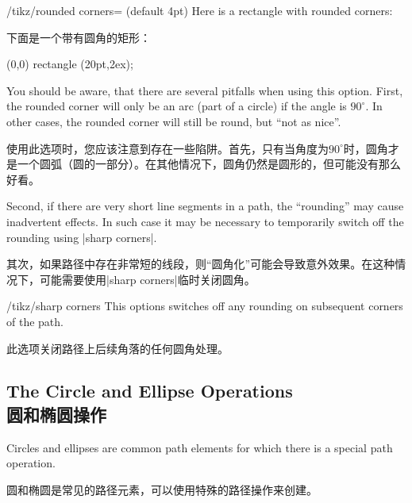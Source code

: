 \begin{key}{/tikz/rounded corners= (default 4pt)}
    Here is a rectangle with rounded corners:

    下面是一个带有圆角的矩形：
\begin{codeexample}[]
\tikz \draw[rounded corners=1ex] (0,0) rectangle (20pt,2ex);
\end{codeexample}

    You should be aware, that there are several pitfalls when using this
    option. First, the rounded corner will only be an arc (part of a circle) if
    the angle is $90^\circ$. In other cases, the rounded corner will still be
    round, but ``not as nice''.

    使用此选项时，您应该注意到存在一些陷阱。首先，只有当角度为$90^\circ$时，圆角才是一个圆弧（圆的一部分）。在其他情况下，圆角仍然是圆形的，但可能没有那么好看。

    Second, if there are very short line segments in a path, the ``rounding''
    may cause inadvertent effects. In such case it may be necessary to
    temporarily switch off the rounding using |sharp corners|.

    其次，如果路径中存在非常短的线段，则“圆角化”可能会导致意外效果。在这种情况下，可能需要使用|sharp corners|临时关闭圆角。

\end{key}

\begin{key}{/tikz/sharp corners}
    This options switches off any rounding on subsequent corners of the path.

    此选项关闭路径上后续角落的任何圆角处理。

\end{key}


\subsection{The Circle and Ellipse Operations\\圆和椭圆操作}

Circles and ellipses are common path elements for which there is a special path
operation.

圆和椭圆是常见的路径元素，可以使用特殊的路径操作来创建。

